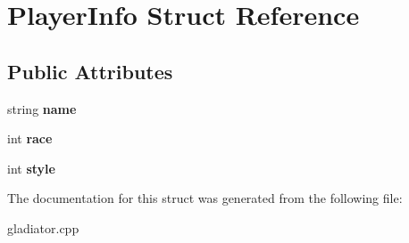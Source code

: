 \hypertarget{struct_player_info}{}\section{Player\+Info Struct Reference}
\label{struct_player_info}
\subsection*{Public Attributes}
\begin{DoxyCompactItemize}
\item 
\mbox{\label{struct_player_info_a8304e6086d72f9e6eaf6b66f3ae366a5}} 
string {\bfseries name}
\item 
\mbox{\label{struct_player_info_aff730fcad1a1ce9a45f0b11516feb7f9}} 
int {\bfseries race}
\item 
\mbox{\label{struct_player_info_a526d25cfbc92a25169560c99bd3d4207}} 
int {\bfseries style}
\end{DoxyCompactItemize}


The documentation for this struct was generated from the following file\+:\begin{DoxyCompactItemize}
\item 
gladiator.\+cpp\end{DoxyCompactItemize}
